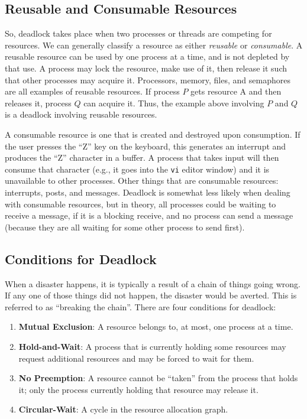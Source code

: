 \subsection*{Reusable and Consumable Resources}
So, deadlock takes place when two processes or threads are competing for resources. We can generally classify a resource as either \textit{reusable} or \textit{consumable}. A reusable resource can be used by one process at a time, and is not depleted by that use. A process may lock the resource, make use of it, then release it such that other processes may acquire it. Processors, memory, files, and semaphores are all examples of reusable resources. If process $P$ gets resource A and then releases it, process $Q$ can acquire it. Thus, the example above involving $P$ and $Q$ is a deadlock involving reusable resources.

A consumable resource is one that is created and destroyed upon consumption. If the user presses the ``Z'' key on the keyboard, this generates an interrupt and produces the ``Z'' character in a buffer. A process that takes input will then consume that character (e.g., it goes into the \texttt{vi} editor window) and it is unavailable to other processes. Other things that are consumable resources: interrupts, posts, and messages. Deadlock is somewhat less likely when dealing with consumable resources, but in theory, all processes could be waiting to receive a message, if it is a blocking receive, and no process can send a message (because they are all waiting for some other process to send first).

\subsection*{Conditions for Deadlock}
When a disaster happens, it is typically a result of a chain of things going wrong. If any one of those things did not happen, the disaster would be averted. This is referred to as ``breaking the chain''. There are four conditions for deadlock:

\begin{enumerate}
	\item \textbf{Mutual Exclusion}: A resource belongs to, at most, one process at a time.
	\item \textbf{Hold-and-Wait}: A process that is currently holding some resources may request additional resources and may be forced to wait for them.
	\item \textbf{No Preemption}: A resource cannot be ``taken'' from the process that holds it; only the process currently holding that resource may release it.
	\item \textbf{Circular-Wait}: A cycle in the resource allocation graph.
\end{enumerate}

